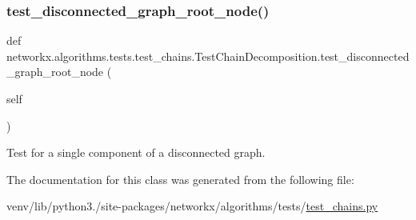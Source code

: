\subsubsection{\texorpdfstring{test\+\_\+disconnected\+\_\+graph\+\_\+root\+\_\+node()}{test\_disconnected\_graph\_root\_node()}}
{\footnotesize\ttfamily def networkx.\+algorithms.\+tests.\+test\+\_\+chains.\+Test\+Chain\+Decomposition.\+test\+\_\+disconnected\+\_\+graph\+\_\+root\+\_\+node (\begin{DoxyParamCaption}\item[{}]{self }\end{DoxyParamCaption})}

\begin{DoxyVerb}Test for a single component of a disconnected graph.\end{DoxyVerb}
 

The documentation for this class was generated from the following file\+:\begin{DoxyCompactItemize}
\item 
venv/lib/python3./site-\/packages/networkx/algorithms/tests/\hyperlink{test__chains_8py}{test\+\_\+chains.\+py}\end{DoxyCompactItemize}
